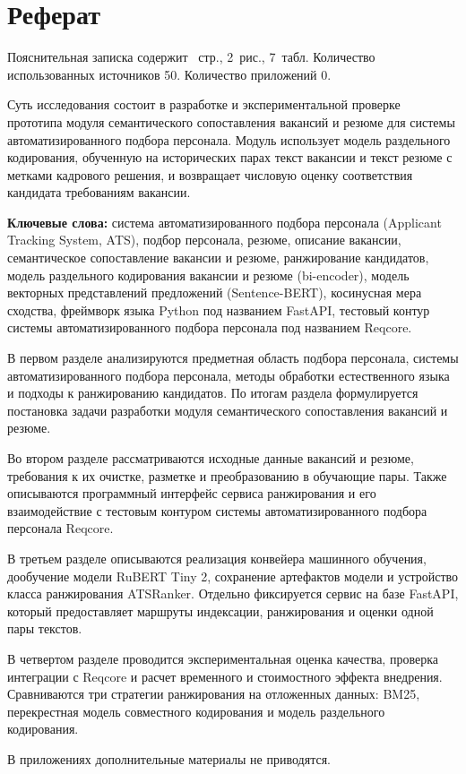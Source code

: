 \chapter*{Реферат}
Пояснительная записка содержит \pageref{end_of_document}~стр., 2~рис., 7~табл. Количество использованных источников 50. Количество приложений 0.\par
Суть исследования состоит в разработке и экспериментальной проверке прототипа модуля семантического сопоставления вакансий и резюме для системы автоматизированного подбора персонала. Модуль использует модель раздельного кодирования, обученную на исторических парах текст вакансии и текст резюме с метками кадрового решения, и возвращает числовую оценку соответствия кандидата требованиям вакансии.\par
\textbf{Ключевые слова:} система автоматизированного подбора персонала (Applicant Tracking System, ATS), подбор персонала, резюме, описание вакансии, семантическое сопоставление вакансии и резюме, ранжирование кандидатов, модель раздельного кодирования вакансии и резюме (bi-encoder), модель векторных представлений предложений (Sentence-BERT), косинусная мера сходства, фреймворк языка Python под названием FastAPI, тестовый контур системы автоматизированного подбора персонала под названием Reqcore.\par
В первом разделе анализируются предметная область подбора персонала, системы автоматизированного подбора персонала, методы обработки естественного языка и подходы к ранжированию кандидатов. По итогам раздела формулируется постановка задачи разработки модуля семантического сопоставления вакансий и резюме.\par
Во втором разделе рассматриваются исходные данные вакансий и резюме, требования к их очистке, разметке и преобразованию в обучающие пары. Также описываются программный интерфейс сервиса ранжирования и его взаимодействие с тестовым контуром системы автоматизированного подбора персонала Reqcore.\par
В третьем разделе описываются реализация конвейера машинного обучения, дообучение модели RuBERT Tiny 2, сохранение артефактов модели и устройство класса ранжирования ATSRanker. Отдельно фиксируется сервис на базе FastAPI, который предоставляет маршруты индексации, ранжирования и оценки одной пары текстов.\par
В четвертом разделе проводится экспериментальная оценка качества, проверка интеграции с Reqcore и расчет временного и стоимостного эффекта внедрения. Сравниваются три стратегии ранжирования на отложенных данных: BM25, перекрестная модель совместного кодирования и модель раздельного кодирования.\par
В приложениях дополнительные материалы не приводятся.\par
